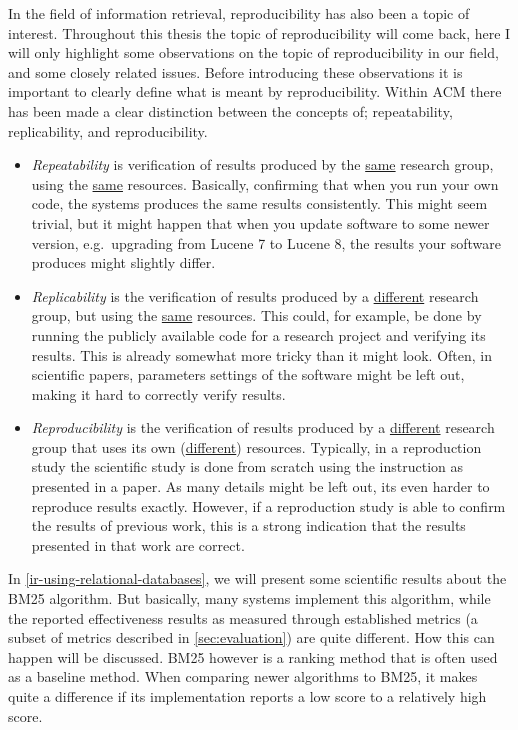 In the field of information retrieval, reproducibility has also been a topic of interest. Throughout this thesis the topic of reproducibility will come back, here I will only highlight some observations on the topic of reproducibility in our field, and some closely related issues. Before introducing these observations it is important to clearly define what is meant by reproducibility. Within ACM there has been made a clear distinction between the concepts of; repeatability, replicability, and reproducibility. 
\begin{itemize}
	\item \emph{Repeatability} is verification of results produced by the \underline{same} research group, using the \underline{same} resources. Basically, confirming that when you run your own code, the systems produces the same results consistently. This might seem trivial, but it might happen that when you update software to some newer version, e.g.\ upgrading from Lucene 7 to Lucene 8, the results your software produces might slightly differ. 
	\item \emph{Replicability} is the verification of results produced by a \underline{different} research group, but using the \underline{same} resources. This could, for example, be done by running the publicly available code for a research project and verifying its results. This is already somewhat more tricky than it might look. Often, in scientific papers, parameters settings of the software might be left out, making it hard to correctly verify results. 
	\item \emph{Reproducibility} is the verification of results produced by a \underline{different} research group that uses its own (\underline{different}) resources. Typically, in a reproduction study the scientific study is done from scratch using the instruction as presented in a paper. As many details might be left out, its even harder to reproduce results exactly. However, if a reproduction study is able to confirm the results of previous work, this is a strong indication that the results presented in that work are correct.
\end{itemize}

In \cref{ir-using-relational-databases}, we will present some scientific results about the BM25 algorithm. But basically, many systems implement this algorithm, while the reported effectiveness results as measured through established metrics (a subset of metrics described in \cref{sec:evaluation}) are quite different. How this can happen will be discussed. BM25 however is a ranking method that is often used as a baseline method. When comparing newer algorithms to BM25, it makes quite a difference if its implementation reports a low score to a relatively high score. 

